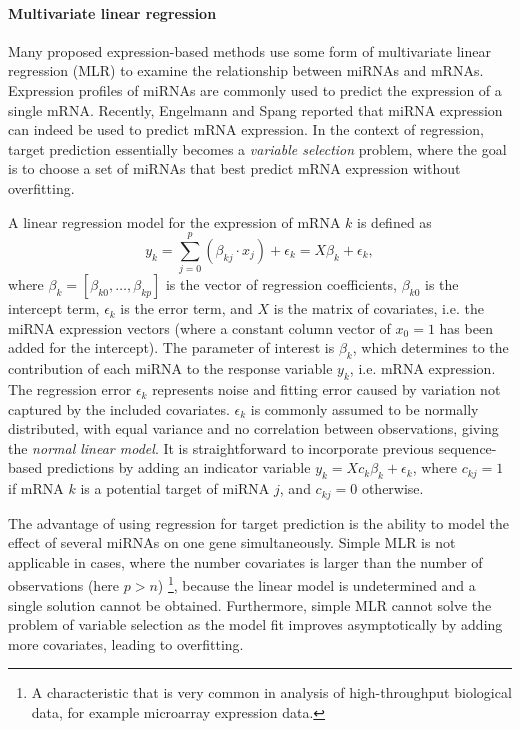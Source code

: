 \paragraph{Multivariate linear regression}
Many proposed expression-based methods use some form of multivariate linear
regression (MLR) to examine the relationship between miRNAs and mRNAs.
Expression profiles of miRNAs are commonly used to predict the expression of a
single mRNA. Recently, Engelmann and Spang \citep{Engelmann2012} reported that miRNA expression can indeed be used to
predict mRNA expression. In the context of regression,
target prediction essentially becomes a \emph{variable selection} problem, where the
goal is to choose a set of miRNAs that best predict mRNA expression without
overfitting.

A linear regression model for the expression of mRNA $k$ is defined as
\begin{equation}
  \label{eq:linear-regression}
	y_k = \sum_{j=0}^{p} (\beta_{kj} \cdot x_j) + \epsilon_k =  X \beta_k + \epsilon_k,
\end{equation}
where $\beta_k = [\beta_{k0}, \dotsc, \beta_{kp}]$ is the vector of regression coefficients,
$\beta_{k0}$ is the intercept term, $\epsilon_k$ is the error term, and $X$ is the
matrix of covariates, i.e. the miRNA expression vectors (where a constant column
vector of $x_0=1$ has been added for the intercept). The parameter of
interest is $\beta_k$, which determines to the contribution of each miRNA to the
response variable $y_k$, i.e. mRNA expression. The regression error $\epsilon_k$
represents noise and fitting error caused by variation not captured by the
included covariates. $\epsilon_k$ is commonly assumed to be normally
distributed, with equal variance and no correlation between observations,
giving the \emph{normal linear model}. It is straightforward to incorporate previous
sequence-based predictions by adding an indicator variable $y_k = X c_k \beta_k + \epsilon_k$,
where $c_{kj} = 1$ if mRNA $k$ is a potential target of miRNA $j$, and $c_{kj} = 0$ otherwise.

The advantage of using regression for target prediction is the ability to
model the effect of several miRNAs on one gene simultaneously.
Simple MLR is not applicable in cases, where the number covariates is larger
than the number of observations (here $p > n$)
\footnote{A characteristic that is very common
in analysis of high-throughput biological data, for example microarray
expression data.}, because the linear model is
undetermined and a single solution cannot be obtained.
Furthermore, simple MLR cannot solve the problem of
variable selection as the model fit improves asymptotically
by adding more covariates, leading to overfitting.


